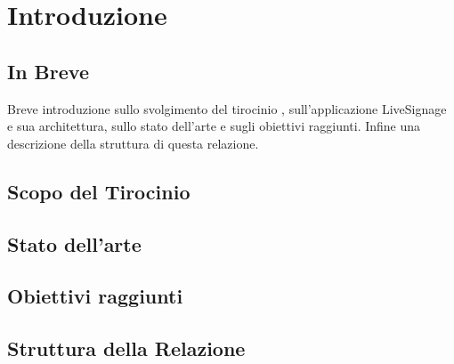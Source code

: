 \chapter{Introduzione}
\linespread{1.5}

\section{In Breve}
Breve introduzione sullo  svolgimento del tirocinio , sull'applicazione LiveSignage e sua architettura, sullo stato dell'arte e sugli obiettivi raggiunti. Infine una descrizione della struttura di questa relazione.

\section{Scopo del Tirocinio}

\section{Stato dell'arte}
\section{Obiettivi raggiunti}
\section{Struttura della Relazione}
